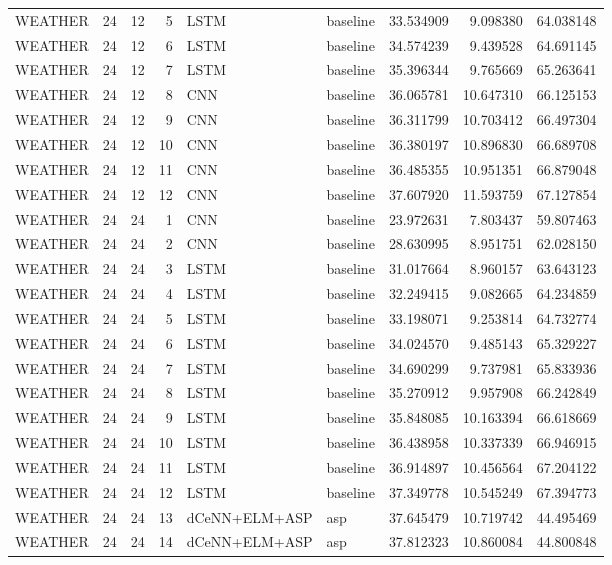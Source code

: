 \begin{table}
\begin{tabular}{lrrrllrrr}
WEATHER & 24 & 12 & 5 & LSTM & baseline & 33.534909 & 9.098380 & 64.038148 \\
WEATHER & 24 & 12 & 6 & LSTM & baseline & 34.574239 & 9.439528 & 64.691145 \\
WEATHER & 24 & 12 & 7 & LSTM & baseline & 35.396344 & 9.765669 & 65.263641 \\
WEATHER & 24 & 12 & 8 & CNN & baseline & 36.065781 & 10.647310 & 66.125153 \\
WEATHER & 24 & 12 & 9 & CNN & baseline & 36.311799 & 10.703412 & 66.497304 \\
WEATHER & 24 & 12 & 10 & CNN & baseline & 36.380197 & 10.896830 & 66.689708 \\
WEATHER & 24 & 12 & 11 & CNN & baseline & 36.485355 & 10.951351 & 66.879048 \\
WEATHER & 24 & 12 & 12 & CNN & baseline & 37.607920 & 11.593759 & 67.127854 \\
WEATHER & 24 & 24 & 1 & CNN & baseline & 23.972631 & 7.803437 & 59.807463 \\
WEATHER & 24 & 24 & 2 & CNN & baseline & 28.630995 & 8.951751 & 62.028150 \\
WEATHER & 24 & 24 & 3 & LSTM & baseline & 31.017664 & 8.960157 & 63.643123 \\
WEATHER & 24 & 24 & 4 & LSTM & baseline & 32.249415 & 9.082665 & 64.234859 \\
WEATHER & 24 & 24 & 5 & LSTM & baseline & 33.198071 & 9.253814 & 64.732774 \\
WEATHER & 24 & 24 & 6 & LSTM & baseline & 34.024570 & 9.485143 & 65.329227 \\
WEATHER & 24 & 24 & 7 & LSTM & baseline & 34.690299 & 9.737981 & 65.833936 \\
WEATHER & 24 & 24 & 8 & LSTM & baseline & 35.270912 & 9.957908 & 66.242849 \\
WEATHER & 24 & 24 & 9 & LSTM & baseline & 35.848085 & 10.163394 & 66.618669 \\
WEATHER & 24 & 24 & 10 & LSTM & baseline & 36.438958 & 10.337339 & 66.946915 \\
WEATHER & 24 & 24 & 11 & LSTM & baseline & 36.914897 & 10.456564 & 67.204122 \\
WEATHER & 24 & 24 & 12 & LSTM & baseline & 37.349778 & 10.545249 & 67.394773 \\
WEATHER & 24 & 24 & 13 & dCeNN+ELM+ASP & asp & 37.645479 & 10.719742 & 44.495469 \\
WEATHER & 24 & 24 & 14 & dCeNN+ELM+ASP & asp & 37.812323 & 10.860084 & 44.800848 \\

\end{tabular}
\end{table}
